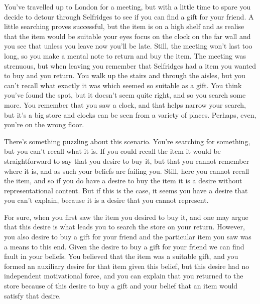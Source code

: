 \documentclass[10pt]{article}
\begin{document}
\begin{scenario}\label{scn:gift}
  You've travelled up to London for a meeting, but with a little time to spare you decide to detour through Selfridges to see if you can find a gift for your friend.
  A little searching proves successful, but the item is on a high shelf and as realise that the item would be suitable your eyes focus on the clock on the far wall and you see that unless you leave now you'll be late.
  Still, the meeting won't last too long, so you make a mental note to return and buy the item.
  The meeting was strenuous, but when leaving you remember that Selfridges had a item you wanted to buy and you return.
  You walk up the stairs and through the aisles, but you can't recall what exactly it was which seemed so suitable as a gift.
  You think you've found the spot, but it doesn't seem quite right, and so you search some more.
  You remember that you saw a clock, and that helps narrow your search, but it's a big store and clocks can be seen from a variety of places.
  Perhaps, even, you're on the wrong floor.
\end{scenario}

There's something puzzling about this scenario.
You're searching for something, but you can't recall what it is.
If you could recall the item it would be straightforward to say that you desire to buy it, but that you cannot remember where it is, and as such your beliefs are failing you.
Still, here you cannot recall the item, and so if you do have a desire to buy the item it is a desire without representational content.
But if this is the case, it seems you have a desire that you can't explain, because it is a desire that you cannot represent.

For sure, when you first saw the item you desired to buy it, and one may argue that this desire is what leads you to search the store on your return.
However, you also desire to buy a gift for your friend and the particular item you saw was a means to this end.
Given the desire to buy a gift for your friend we can find fault in your beliefs.
You believed that the item was a suitable gift, and you formed an auxiliary desire for that item given this belief, but this desire had no independent motivational force, and you can explain that you returned to the store because of this desire to buy a gift and your belief that an item would satisfy that desire.
\end{document}
